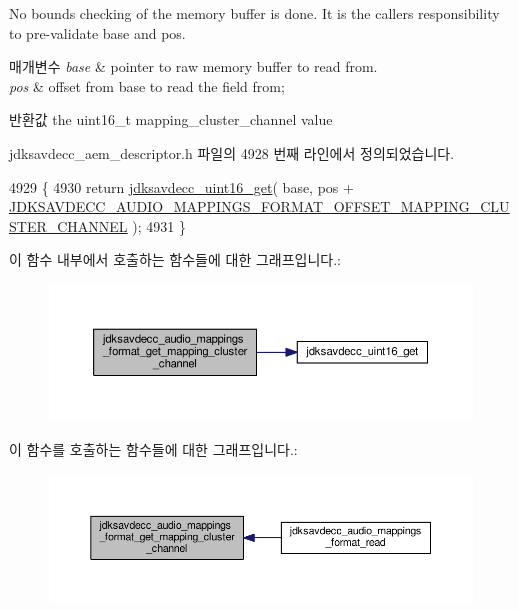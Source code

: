 No bounds checking of the memory buffer is done. It is the caller\textquotesingle{}s responsibility to pre-\/validate base and pos.


\begin{DoxyParams}{매개변수}
{\em base} & pointer to raw memory buffer to read from. \\
\hline
{\em pos} & offset from base to read the field from; \\
\hline
\end{DoxyParams}
\begin{DoxyReturn}{반환값}
the uint16\+\_\+t mapping\+\_\+cluster\+\_\+channel value 
\end{DoxyReturn}


jdksavdecc\+\_\+aem\+\_\+descriptor.\+h 파일의 4928 번째 라인에서 정의되었습니다.


\begin{DoxyCode}
4929 \{
4930     \textcolor{keywordflow}{return} \hyperlink{group__endian_ga3fbbbc20be954aa61e039872965b0dc9}{jdksavdecc\_uint16\_get}( base, pos + 
      \hyperlink{group__audio__mappings__format_gada8b69df4c259ff90dd16955a184183c}{JDKSAVDECC\_AUDIO\_MAPPINGS\_FORMAT\_OFFSET\_MAPPING\_CLUSTER\_CHANNEL}
       );
4931 \}
\end{DoxyCode}


이 함수 내부에서 호출하는 함수들에 대한 그래프입니다.\+:
\nopagebreak
\begin{figure}[H]
\begin{center}
\leavevmode
\includegraphics[width=350pt]{group__audio__mappings__format_ga3b0b8e360debc1d76376fb2e045eea60_cgraph}
\end{center}
\end{figure}




이 함수를 호출하는 함수들에 대한 그래프입니다.\+:
\nopagebreak
\begin{figure}[H]
\begin{center}
\leavevmode
\includegraphics[width=350pt]{group__audio__mappings__format_ga3b0b8e360debc1d76376fb2e045eea60_icgraph}
\end{center}
\end{figure}


